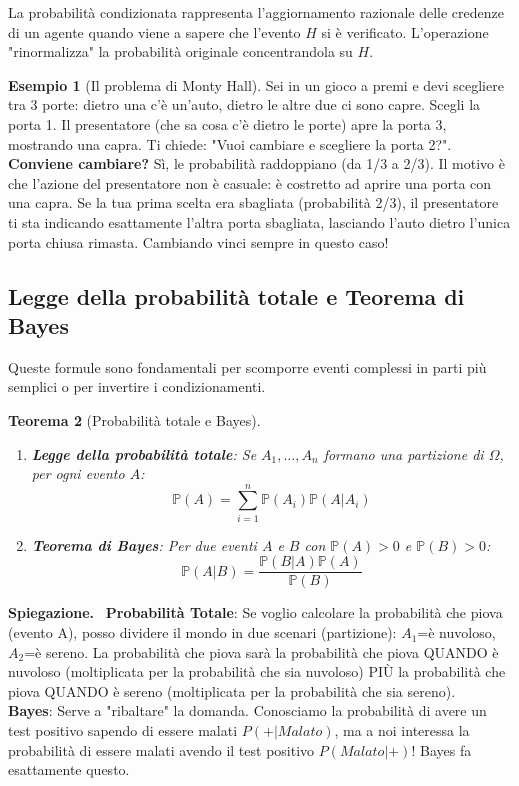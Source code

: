 \documentclass[11pt, a4paper]{report}
\theoremstyle{plain}
\newtheorem{theorem}{Teorema}[chapter]
\theoremstyle{definition}
\newtheorem{esempio}[theorem]{Esempio}
\theoremstyle{remark}
\newenvironment{spiegazione}[1][Spiegazione]
{\begin{mdframed}[backgroundcolor=green!5, linecolor=green!50, linewidth=2pt, topline=false, rightline=false, bottomline=false]
\textbf{\textsf{#1.}}\ }
{\end{mdframed}}
\newcommand{\PP}{\mathbb{P}}
\newcommand{\1}{\mathbf{1}}
\begin{document}
La probabilità condizionata rappresenta l'aggiornamento razionale delle credenze di un agente quando viene a sapere che l'evento $H$ si è verificato. L'operazione "rinormalizza" la probabilità originale concentrandola su $H$.

\begin{esempio}[Il problema di Monty Hall]
Sei in un gioco a premi e devi scegliere tra 3 porte: dietro una c'è un'auto, dietro le altre due ci sono capre. Scegli la porta 1. Il presentatore (che sa cosa c'è dietro le porte) apre la porta 3, mostrando una capra. Ti chiede: "Vuoi cambiare e scegliere la porta 2?".
\textbf{Conviene cambiare?}
Sì, le probabilità raddoppiano (da 1/3 a 2/3). Il motivo è che l'azione del presentatore non è casuale: è costretto ad aprire una porta con una capra. Se la tua prima scelta era sbagliata (probabilità 2/3), il presentatore ti sta indicando esattamente l'altra porta sbagliata, lasciando l'auto dietro l'unica porta chiusa rimasta. Cambiando vinci sempre in questo caso!
\end{esempio}

\subsection{Legge della probabilità totale e Teorema di Bayes}

Queste formule sono fondamentali per scomporre eventi complessi in parti più semplici o per invertire i condizionamenti.

\begin{theorem}[Probabilità totale e Bayes]
\begin{enumerate}
    \item \textbf{Legge della probabilità totale}: Se $A_1, \dots, A_n$ formano una partizione di $\Omega$, per ogni evento $A$:
    \[ \PP(A) = \sum_{i=1}^n \PP(A_i) \PP(A|A_i) \]
    \item \textbf{Teorema di Bayes}: Per due eventi $A$ e $B$ con $\PP(A)>0$ e $\PP(B)>0$:
    \[ \PP(A|B) = \frac{\PP(B|A)\PP(A)}{\PP(B)} \]
\end{enumerate}
\end{theorem}

\begin{spiegazione}
    \textbf{Probabilità Totale}: Se voglio calcolare la probabilità che piova (evento A), posso dividere il mondo in due scenari (partizione): $A_1$=è nuvoloso, $A_2$=è sereno. La probabilità che piova sarà la probabilità che piova QUANDO è nuvoloso (moltiplicata per la probabilità che sia nuvoloso) PIÙ la probabilità che piova QUANDO è sereno (moltiplicata per la probabilità che sia sereno). \\
    \textbf{Bayes}: Serve a "ribaltare" la domanda. Conosciamo la probabilità di avere un test positivo sapendo di essere malati $P(+|Malato)$, ma a noi interessa la probabilità di essere malati avendo il test positivo $P(Malato|+)$! Bayes fa esattamente questo.
\end{spiegazione}
\end{document}
